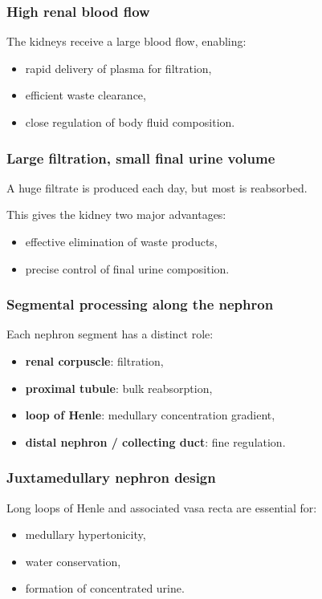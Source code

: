 \documentclass[11pt,a4paper]{article}
\begin{document}
\subsubsection{High renal blood flow}

The kidneys receive a large blood flow, enabling:
\begin{itemize}
    \item rapid delivery of plasma for filtration,
    \item efficient waste clearance,
    \item close regulation of body fluid composition.
\end{itemize}

\subsubsection{Large filtration, small final urine volume}

A huge filtrate is produced each day, but most is reabsorbed.

This gives the kidney two major advantages:
\begin{itemize}
    \item effective elimination of waste products,
    \item precise control of final urine composition.
\end{itemize}

\subsubsection{Segmental processing along the nephron}

Each nephron segment has a distinct role:
\begin{itemize}
    \item \textbf{renal corpuscle}: filtration,
    \item \textbf{proximal tubule}: bulk reabsorption,
    \item \textbf{loop of Henle}: medullary concentration gradient,
    \item \textbf{distal nephron / collecting duct}: fine regulation.
\end{itemize}

\subsubsection{Juxtamedullary nephron design}

Long loops of Henle and associated vasa recta are essential for:
\begin{itemize}
    \item medullary hypertonicity,
    \item water conservation,
    \item formation of concentrated urine.
\end{itemize}
\end{document}
